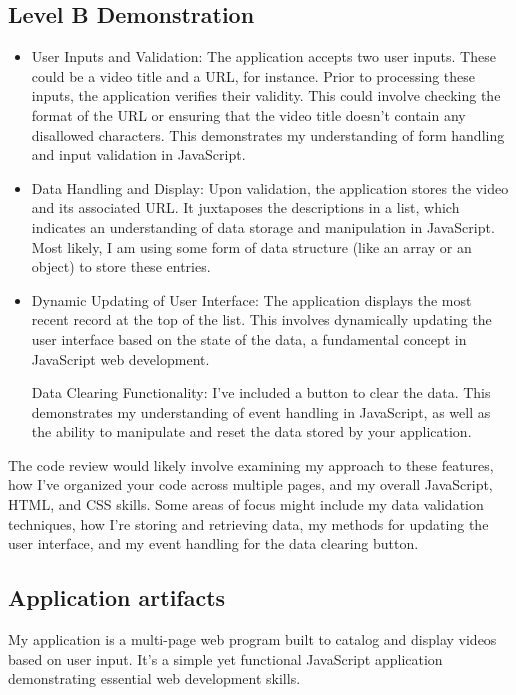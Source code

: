 \documentclass[a4paper, 11pt]{report}
\begin{document}
\subsection{Level B Demonstration}
\begin{itemize}
\item User Inputs and Validation: The application accepts two user inputs. These could be a video title and a URL, for instance. Prior to processing these inputs, the application verifies their validity. This could involve checking the format of the URL or ensuring that the video title doesn't contain any disallowed characters. This demonstrates my understanding of form handling and input validation in JavaScript.

\item Data Handling and Display: Upon validation, the application stores the video and its associated URL. It juxtaposes the descriptions in a list, which indicates an understanding of data storage and manipulation in JavaScript. Most likely,  I am using some form of data structure (like an array or an object) to store these entries.

\item Dynamic Updating of User Interface: The application displays the most recent record at the top of the list. This involves dynamically updating the user interface based on the state of the data, a fundamental concept in JavaScript web development.

Data Clearing Functionality: I've included a button to clear the data. This demonstrates my understanding of event handling in JavaScript, as well as the ability to manipulate and reset the data stored by your application.
\end{itemize}
The code review would likely involve examining my approach to these features, how I've organized your code across multiple pages, and my overall JavaScript, HTML, and CSS skills. Some areas of focus might include my data validation techniques, how I're storing and retrieving data, my methods for updating the user interface, and my event handling for the data clearing button.

\subsection{Application artifacts}

My application is a multi-page web program built to catalog and display videos based on user input. It's a simple yet functional JavaScript application demonstrating essential web development skills.
\end{document}
